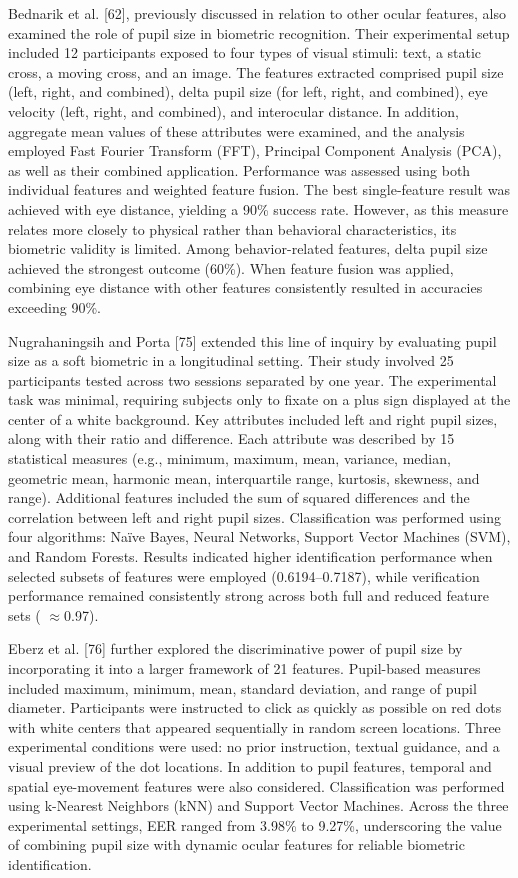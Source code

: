 \documentclass[12pt]{report}
\begin{document}
Bednarik et al. [62], previously discussed in relation to other ocular features, also examined the role of pupil size in biometric recognition. 
Their experimental setup included 12 participants exposed to four types of visual stimuli: text, a static cross, a moving cross, and an image.
The features extracted comprised pupil size (left, right, and combined), delta pupil size (for left, right, and combined), eye velocity (left, right, and combined), and interocular distance.
In addition, aggregate mean values of these attributes were examined, and the analysis employed Fast Fourier Transform (FFT), Principal Component Analysis (PCA), as well as their combined application.
Performance was assessed using both individual features and weighted feature fusion. 
The best single-feature result was achieved with eye distance, yielding a 90\% success rate.
However, as this measure relates more closely to physical rather than behavioral characteristics, its biometric validity is limited.
Among behavior-related features, delta pupil size achieved the strongest outcome (60\%). When feature fusion was applied, combining eye distance with other features consistently resulted in accuracies exceeding 90\%.

Nugrahaningsih and Porta [75] extended this line of inquiry by evaluating pupil size as a soft biometric in a longitudinal setting. 
Their study involved 25 participants tested across two sessions separated by one year. 
The experimental task was minimal, requiring subjects only to fixate on a plus sign displayed at the center of a white background.
Key attributes included left and right pupil sizes, along with their ratio and difference.
Each attribute was described by 15 statistical measures (e.g., minimum, maximum, mean, variance, median, geometric mean, harmonic mean, interquartile range, kurtosis, skewness, and range). 
Additional features included the sum of squared differences and the correlation between left and right pupil sizes.
Classification was performed using four algorithms: Naïve Bayes, Neural Networks, Support Vector Machines (SVM), and Random Forests.
Results indicated higher identification performance when selected subsets of features were employed (0.6194–0.7187), while verification performance remained consistently strong across both full and reduced feature sets ( $\approx$0.97).

Eberz et al. [76] further explored the discriminative power of pupil size by incorporating it into a larger framework of 21 features.
Pupil-based measures included maximum, minimum, mean, standard deviation, and range of pupil diameter. 
Participants were instructed to click as quickly as possible on red dots with white centers that appeared sequentially in random screen locations.
Three experimental conditions were used: no prior instruction, textual guidance, and a visual preview of the dot locations. 
In addition to pupil features, temporal and spatial eye-movement features were also considered. 
Classification was performed using k-Nearest Neighbors (kNN) and Support Vector Machines. 
Across the three experimental settings, EER ranged from 3.98\% to 9.27\%, underscoring the value of combining pupil size with dynamic ocular features for reliable biometric identification.
\end{document}
